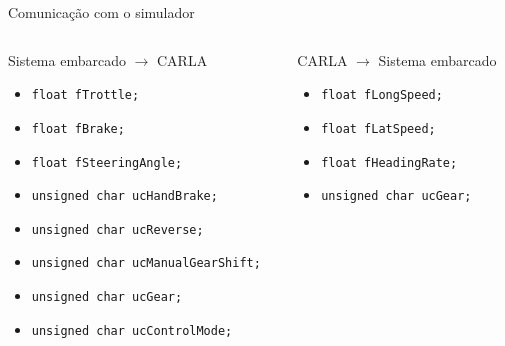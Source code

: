 \documentclass{if-beamer}
\begin{document}
\begin{frame}{Comunicação com o simulador}
	
	\begin{columns}
		
		\begin{column}{0.5\textwidth}
			
			\begin{block}{Sistema embarcado $\longrightarrow$ CARLA}
				
				\begin{itemize}
					\item \texttt{float fTrottle;}
					\item \texttt{float fBrake;}
					\item \texttt{float fSteeringAngle;}
					\item \texttt{unsigned char ucHandBrake;}
					\item \texttt{unsigned char ucReverse;}
					\item \texttt{unsigned char ucManualGearShift;}
					\item \texttt{unsigned char ucGear;}
					\item \texttt{unsigned char ucControlMode;}
					
				\end{itemize}
				
			\end{block}
			
		\end{column}
		
		\begin{column}{0.5\textwidth}
			
			\begin{block}{CARLA $\longrightarrow$ Sistema embarcado }
				
				\begin{itemize}
					\item \texttt{float fLongSpeed;}
					\item \texttt{float fLatSpeed;}
					\item \texttt{float fHeadingRate;}
					\item \texttt{unsigned char ucGear;}
					
				\end{itemize}
				
			\end{block}
			
		\end{column}
		
	\end{columns}
	
\end{frame}
\end{document}
